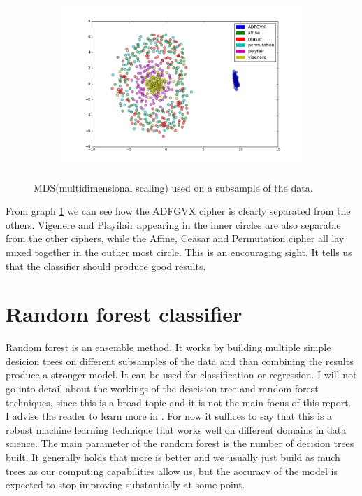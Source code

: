 \documentclass[a4paper]{article}
\begin{document}
\begin{figure}[H]
    \centering
    \begin{subfigure}[h]{0.5\textwidth}
        \centering
        \includegraphics[height=2.5in]{img/mds_features.png}
    \end{subfigure}
    \caption{MDS(multidimensional scaling) used on a subsample of the data.}
    \label{fig:mds}
\end{figure}

From graph \ref{fig:mds} we can see how the ADFGVX cipher is clearly separated from the others. Vigenere and Playifair appearing in the inner circles are also separable from the other ciphers, while the Affine, Ceasar and Permutation cipher all lay mixed together in the outher most circle. This is an encouraging sight. It tells us that the classifier should produce good results.

\section*{Random forest classifier}
Random forest is an ensemble method. It works by building multiple simple desicion trees on different subsamples of the data and than combining the results produce a stronger model. It can be used for classification or regression. I will not go into detail about the workings of the descision tree and random forest techniques, since this is a broad topic and it is not the main focus of this report. I advise the reader to learn more in \cite{breiman2001random}. For now it suffices to say that this is a robust machine learning technique that works well on different domains in data science. The main parameter of the random forest is the number of decision trees built. It generally holds that more is better and we usually just build as much trees as our computing capabilities allow us, but the accuracy of the model is expected to stop improving substantially at some point.
\end{document}

